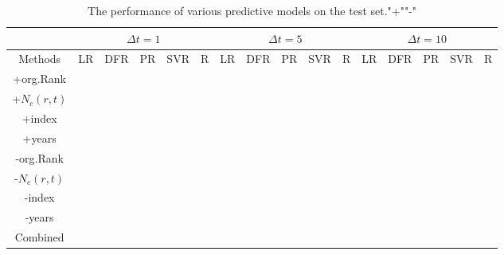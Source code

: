 \begin{table*}[t]
\begin{center}
\begin{tabular}{c|c|c|c|c|c|c|c|c|c|c|c|c|c|c|c}
\hline
& \multicolumn{5}{|c|}{\textbf{$\Delta t =1$}}& \multicolumn{5}{|c|}{$\Delta t =5$}& \multicolumn{5}{|c}{$\Delta t =10$}\\

\hline
Methods & LR & DFR & PR & SVR & R& LR & DFR & PR & SVR & R& LR & DFR & PR & SVR & R\\
\hline\hline
+org.Rank & & & & & & & & & & & & & & & \\
\hline
+$N_c(r,t)$ & & & & & & & & & & & & & & & \\
\hline
+index & & & & & & & & & & & & & & & \\
\hline
+years & & & & & & & & & & & & & & & \\
\hline\hline
-org.Rank & & & & & & & & & & & & & & & \\
\hline
-$N_c(r,t)$ & & & & & & & & & & & & & & & \\
\hline
-index & & & & & & & & & & & & & & & \\
\hline
-years & & & & & & & & & & & & & & & \\
\hline\hline
Combined & & & & & & & & & & & & & & & \\
\hline
\end{tabular}
\end{center}
\caption{The performance of various predictive models on the test set."+""-"}
\label{tbl-r2}

\end{table*}

